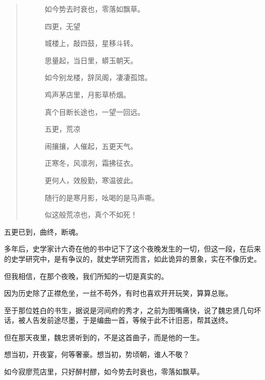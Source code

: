 \begin{multicols}{\theparacolNo}
\begin{quote}
\begin{spacing}{0.5}
{{\begin{description}
								\item[\textcolor{Gray}{\faQuoteRight}] 如今势去时衰也，零落如飘草。
								\item[\textcolor{Gray}{\faQuoteRight}] 四更，无望
								\item[\textcolor{Gray}{\faQuoteRight}] 城楼上，敲四鼓，星移斗转。
								\item[\textcolor{Gray}{\faQuoteRight}] 思量起，当日里，蟒玉朝天。
								\item[\textcolor{Gray}{\faQuoteRight}] 如今别龙楼，辞凤阁，凄凄孤馆。
								\item[\textcolor{Gray}{\faQuoteRight}] 鸡声茅店里，月影草桥烟。
								\item[\textcolor{Gray}{\faQuoteRight}] 真个目断长途也，一望一回远。
								\item[\textcolor{Gray}{\faQuoteRight}] 五更，荒凉
								\item[\textcolor{Gray}{\faQuoteRight}] 闹攘攘，人催起，五更天气。
								\item[\textcolor{Gray}{\faQuoteRight}] 正寒冬，风凛冽，霜拂征衣。
								\item[\textcolor{Gray}{\faQuoteRight}] 更何人，效殷勤，寒温彼此。
								\item[\textcolor{Gray}{\faQuoteRight}] 随行的是寒月影，吆喝的是马声嘶。
								\item[\textcolor{Gray}{\faQuoteRight}] 似这般荒凉也，真个不如死！
							\end{description}
						}}
			\end{spacing}
		\end{quote}

		五更已到，曲终，断魂。

		多年后，史学家计六奇在他的书中记下了这个夜晚发生的一切，但这一段，在后来的史学研究中，是有争议的，就史学研究而言，如此诡异的景象，实在不像历史。

		但我相信，在那个夜晚，我们所知的一切是真实的。

		因为历史除了正襟危坐，一丝不苟外，有时也喜欢开开玩笑，算算总账。

		至于那位姓白的书生，据说是河间府的秀才，之前为图嘴痛快，说了魏忠贤几句坏话，被人告发前途尽墨，于是编曲一首，等候于此不计旧恶，帮其送终。

		但在那天夜里，魏忠贤听到的，不是这首曲子，而是他的一生。

		想当初，开夜宴，何等奢豪。想当初，势顷朝，谁人不敬？

		如今寂廖荒店里，只好醉村醪，如今势去时衰也，零落如飘草。


\end{multicols}
